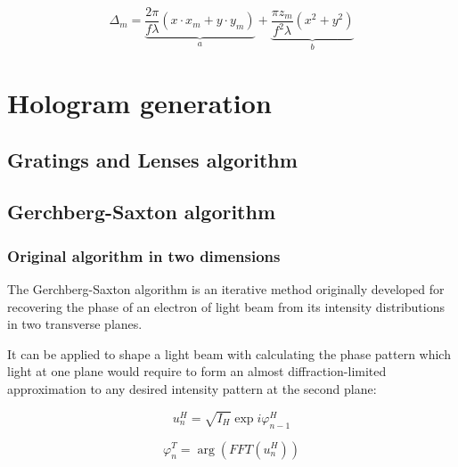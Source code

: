 \documentclass{kepfl}
\begin{document}
\begin{equation}
{\Delta _m} = \underbrace {\frac{{2\pi }}{{f\lambda }}(x \cdot {x_m} + y \cdot {y_m})}_a + \underbrace {\frac{{\pi {z_m}}}{{{f^2}\lambda }}({x^2} + {y^2})}_b	
\end{equation}

\section{Hologram generation}
\subsection{Gratings and Lenses algorithm}

\subsection{Gerchberg-Saxton algorithm}
\subsubsection{Original algorithm in two dimensions}
The Gerchberg-Saxton algorithm is an iterative method originally developed for recovering the phase of an electron of light beam from its intensity distributions in two transverse planes. 

It can be applied to shape a light beam with calculating the phase pattern which light at one plane would require to form an almost diffraction-limited approximation to any desired intensity pattern at the second plane:


\[u_n^H=\sqrt{I_H}\exp{i\varphi_{n-1}^H}\]

\[\varphi_n^T = \arg\left(FFT\left(u_n^H\right)\right)\]
\end{document}
